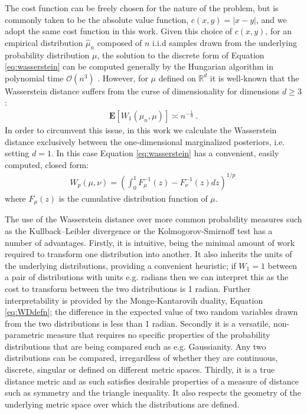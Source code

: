 \documentclass[fleqn,usenatbib,useAMS]{mnras}
\begin{document}
The cost function can be freely chosen for the nature of the problem, but is commonly taken to be the absolute value function, $c(x,y) = |x-y|$, and we adopt the same cost function in this work. Given this choice of $c(x,y)$, for an empirical distribution $\hat{\mu}_n$ composed of $n$ i.i.d samples drawn from the underlying probability distribution $\mu$, the solution to the discrete form of Equation \eqref{eq:wasserstein} can be computed generally by the Hungarian algorithm \citep{Kuhn} in polynomial time $\mathcal{O}(n^3)$ \citep{Villani2009}. However, for $\mu$ defined on $\mathbb{R}^d$ it is well-known \citep{Dudley} that the Wasserstein distance suffers from the curse of dimensionality for dimensions $d \geq 3$:
\begin{eqnarray}
	\boldsymbol{E} [W_1(\hat{\mu}_n,\mu)] \asymp n^{-\frac{1}{d}} \ .
\end{eqnarray}
In order to circumvent this issue, in this work we calculate the Wasserstein distance exclusively between the one-dimensional marginalized posteriors, i.e. setting $d=1$. In this case Equation \eqref{eq:wasserstein} has a convenient, easily computed, closed form:
\begin{eqnarray}
	W_p(\mu,\nu)= \left(\int_0^1  F_{\mu}^{-1} (z) - F_{\nu}^{-1} (z) dz \right)^{1/p} \, \label{eq:wasserstein}
\end{eqnarray}
where $F_{\mu}(z)$ is the cumulative distribution function of $\mu$. \newline  


The use of the Wasserstein distance over more common probability measures such as the Kullback–Leibler divergence or the  Kolmogorov-Smirnoff test has a number of advantages. Firstly, it is intuitive, being the minimal amount of work required to transform one distribution into another. It also inherits the units of the underlying distributions, providing a convenient heuristic; if $W_1 =1$ between a pair of distributions with units e.g. radians then we can interpret this as the cost to transform between the two distributions is 1 radian. Further interpretability is provided by the Monge-Kantarovih duality, Equation \eqref{eq:WDdefn}; the difference in the expected value of two random variables drawn from the two distributions is less than 1 radian. Secondly it is a versatile, non-parametric measure that requires no specific properties of the probability distributions that are being compared such as e.g. Gaussianity. Any two distributions can be compared, irregardless of whether they are continuous, discrete, singular or defined on different metric spaces. Thirdly, it is a true distance metric and as such satisfies desirable properties of a measure of distance such as symmetry and the triangle inequality. It also respects the geometry of the underlying metric space over which the distributions are defined.  
\end{document}
